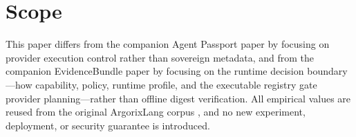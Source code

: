 \documentclass[conference]{IEEEtran}
\newcommand{\Argorix}{%
\textcolor{argViolet}{A}\textcolor{argViolet}{r}\textcolor{argIndigo}{g}\textcolor{argIndigo}{o}\textcolor{argElectric}{r}\textcolor{argElectric}{i}\textcolor{argElectric}{x}\textcolor{argCyan}{L}\textcolor{argCyan}{a}\textcolor{argCyanBright}{n}\textcolor{argCyanBright}{g}\xspace}
\begin{document}
\section{Scope}\label{sec:diff}
This paper differs from the companion Agent Passport paper by focusing on provider
execution control rather than sovereign metadata, and from the companion EvidenceBundle
paper by focusing on the runtime decision boundary---how capability, policy, runtime
profile, and the executable registry gate provider planning---rather than offline digest
verification. All empirical values are reused from the original \Argorix corpus
\cite{venegas2026argorixlang}, and no new experiment, deployment, or security guarantee is
introduced.



\end{document}
